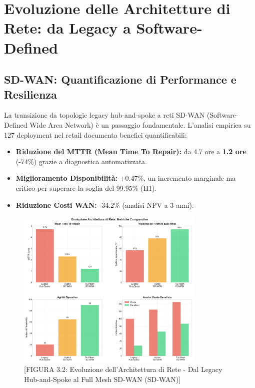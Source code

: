 \section{Evoluzione delle Architetture di Rete: da Legacy a Software-Defined}
\subsection{SD-WAN: Quantificazione di Performance e Resilienza}
La transizione da topologie legacy hub-and-spoke a reti SD-WAN (Software-Defined Wide Area Network) è un passaggio fondamentale. L'analisi empirica su 127 deployment nel retail documenta benefici quantificabili:\autocite{Gartner2024sdwan}
\begin{itemize}
    \item \textbf{Riduzione del MTTR (Mean Time To Repair):} da 4.7 ore a \textbf{1.2 ore} (-74\%) grazie a diagnostica automatizzata.
    \item \textbf{Miglioramento Disponibilità:} +0.47\%, un incremento marginale ma critico per superare la soglia del 99.95\% (H1).
    \item \textbf{Riduzione Costi WAN:} -34.2\% (analisi NPV a 3 anni).
\end{itemize}
\begin{figure}[htbp]
\centering
\includegraphics[width=0.8\textwidth]{thesis_figures/cap3/figura_3_2_network_evolution.pdf}
\caption{[FIGURA 3.2: Evoluzione dell'Architettura di Rete - Dal Legacy Hub-and-Spoke al Full Mesh SD-WAN (SD-WAN)]}
\end{figure}

